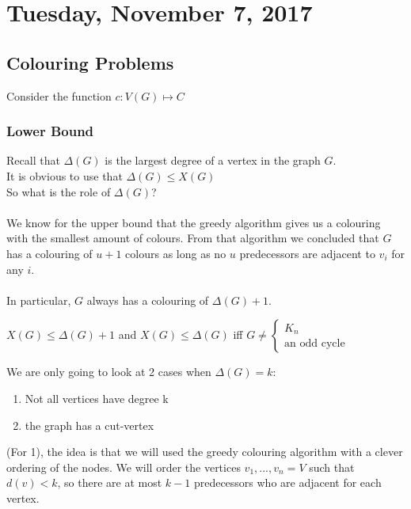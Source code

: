 \documentclass[12pt]{article}
\begin{document}
\newpage

\section{Tuesday, November 7, 2017}

\subsection{Colouring Problems}

Consider the function $c: V(G) \mapsto C$

\subsubsection{Lower Bound}

Recall that $\Delta (G)$ is the largest degree of a vertex in the graph $G$.\\
It is obvious to use that $\Delta (G) \leq X(G)$\\
So what is the role of $\Delta (G)$?\\
\\
We know for the upper bound that the greedy algorithm gives us a colouring with the smallest amount of colours. From that algorithm we concluded that $G$ has a colouring of $u+1$ colours as long as no $u$ predecessors are adjacent to $v_i$ for any $i$.\\
\\
In particular, $G$ always has a colouring of $\Delta (G) + 1$.
\begin{tcolorbox}[title=Brooke's Theorem]
	$X(G) \leq \Delta (G) + 1$ and $X(G) \leq \Delta (G)$ iff $G\neq \begin{cases}
		K_n\\
		\text{an odd cycle}
	\end{cases}
$
\end{tcolorbox}

We are only going to look at 2 cases when $\Delta (G) = k$:
\begin{enumerate}
	\item{Not all vertices have degree k}
	\item{the graph has a cut-vertex}
\end{enumerate}

(For 1), the idea is that we will used the greedy colouring algorithm with a clever ordering of the nodes. We will order the vertices $v_1, ... , v_n = V$ such that $d(v) < k$, so there are at most $k-1$ predecessors who are adjacent for each vertex.\\
\end{document}
